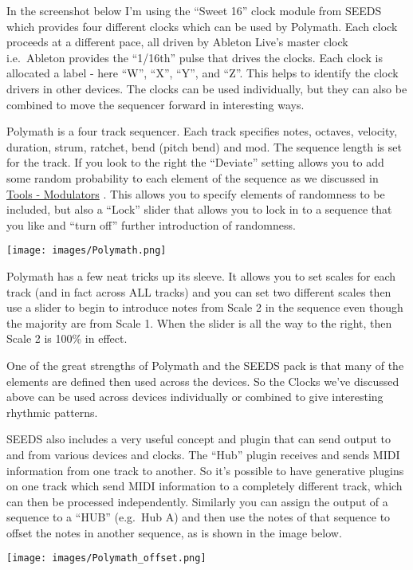 \documentclass[
  12pt,
  letterpaper,
  oneside,
  open=any]{scrbook}
\begin{document}
In the screenshot below I'm using the ``Sweet 16'' clock module from
SEEDS which provides four different clocks which can be used by
Polymath. Each clock proceeds at a different pace, all driven by Ableton
Live's master clock i.e.~Ableton provides the ``1/16th'' pulse that
drives the clocks. Each clock is allocated a label - here ``W'', ``X'',
``Y'', and ``Z''. This helps to identify the clock drivers in other
devices. The clocks can be used individually, but they can also be
combined to move the sequencer forward in interesting ways.

Polymath is a four track sequencer. Each track specifies notes, octaves,
velocity, duration, strum, ratchet, bend (pitch bend) and mod. The
sequence length is set for the track. If you look to the right the
``Deviate'' setting allows you to add some random probability to each
element of the sequence as we discussed in
\hyperref[Chapter-007-Tools-Modulators]{Tools - Modulators} . This
allows you to specify elements of randomness to be included, but also a
``Lock'' slider that allows you to lock in to a sequence that you like
and ``turn off'' further introduction of randomness.

\texttt{[image: images/Polymath.png]}

Polymath has a few neat tricks up its sleeve. It allows you to set
scales for each track (and in fact across ALL tracks) and you can set
two different scales then use a slider to begin to introduce notes from
Scale 2 in the sequence even though the majority are from Scale 1. When
the slider is all the way to the right, then Scale 2 is 100\% in effect.

One of the great strengths of Polymath and the SEEDS pack is that many
of the elements are defined then used across the devices. So the Clocks
we've discussed above can be used across devices individually or
combined to give interesting rhythmic patterns.

SEEDS also includes a very useful concept and plugin that can send
output to and from various devices and clocks. The ``Hub'' plugin
receives and sends MIDI information from one track to another. So it's
possible to have generative plugins on one track which send MIDI
information to a completely different track, which can then be processed
independently. Similarly you can assign the output of a sequence to a
``HUB'' (e.g.~Hub A) and then use the notes of that sequence to offset
the notes in another sequence, as is shown in the image below.

\texttt{[image: images/Polymath\_offset.png]}
\end{document}
